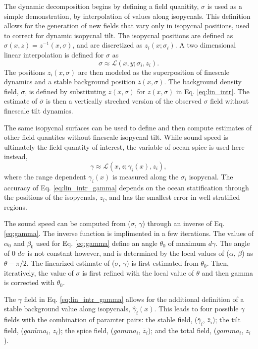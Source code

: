 \documentclass[preprint,NumberedRefs]{JASA}
\begin{document}
The dynamic decomposition begins by defining a field quanitity, $\sigma$ is used as a simple demonstration, by interpolation of values along isopycnals. This definition allows for the generation of new fields that vary only in isopycnal positions, used to correct for dynamic isopycnal tilt. The isopycnal positions are defined as $\sigma(x, z) = z^{-1}(x, \sigma)$, and are discretized as $z_i(x; \sigma_i)$. A two dimensional linear interpolation is defined for $\sigma$ as
\begin{equation}
    \sigma\approx\mathcal{L}(x, y; \sigma_i, z_i).
    \label{eq:lin_intr}
\end{equation}
The positions $z_i(x, \sigma)$ are then modeled as the superposition of finescale dynamics and a stable background position $\bar{z}(x, \sigma)$. The background density field, $\bar{\sigma}$, is defined by substituting $\bar{z}(x, \sigma)$ for $z(x, \sigma)$ in Eq. \eqref{eq:lin_intr}. The estimate of $\bar{\sigma}$ is then a vertically streched version of the observed $\sigma$ field without finescale tilt dynamics.

The same isopycnal surfaces can be used to define and then compute estimates of other field quantites without finescale isopycnal tilt. While sound speed is ultimately the field quantity of interest, the variable of ocean spice is used here instead,
\begin{equation}
    \gamma\approx\mathcal{L}(x, z; \gamma_i(x), z_i),
    \label{eq:lin_intr_gamma}
\end{equation}
where the range dependent $\gamma_i(x)$ is measured along the $\sigma_i$ isopycnal. The accuracy of Eq. \eqref{eq:lin_intr_gamma} depends on the ocean statification through the positions of the isopycnals, $z_i$, and has the smallest error in well stratified regions.

The sound speed can be computed from ($\sigma$, $\gamma$) through an inverse of Eq. \eqref{eq:gamma}. The inverse function is implimented in a few iterations. The values of $\alpha_0$ and $\beta_0$ used for Eq. \eqref{eq:gamma} define an angle $\theta_0$ of maximum $d\gamma$. The angle of 0 $d\sigma$ is not constant however, and is determined by the local values of ($\alpha$, $\beta$) as $\theta - \pi / 2$. The linearized estimate of ($\sigma$, $\gamma$) is first estimated from $\theta_0$. Then, iteratively, the value of $\sigma$ is first refined with the local value of $\theta$ and then gamma is corrected with $\theta_0$.

The $\gamma$ field in Eq. \eqref{eq:lin_intr_gamma} allows for the additional definition of a stable background value along isopycnals, $\hat{\gamma}_i(x)$. This leads to four possible $\gamma$ fields with the combination of paramter pairs: the stable field, ($\bar{\gamma}_i$, $\bar{z}_i$); the tilt field, ($\bar{gamma_i}$, $z_i$); the spice field, ($gamma_i$, $\bar{z}_i$); and the total field, ($gamma_i$, $z_i$).
\end{document}
